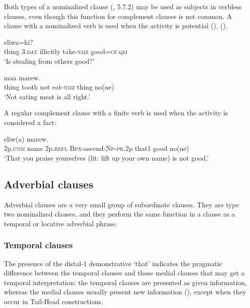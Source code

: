 Both types of a nominalized clause (, 5.7.2) may be used as subjects in verbless clauses, even though this function for complement clauses is not common. A clause with a nominalized verb is used when the activity is potential (), (). 

\ea%
\label{ex:x1636}
  eliwa=ki? \\
thing  3.\textsc{dat} illicitly take-\textsc{nmz} good=\textsc{cf}.\textsc{qm}\\
\glt`Is stealing from others good?'
\z


\ea%
\label{ex:x1637}
  maa  marew.\\
thing  tooth  not  eat-\textsc{nmz} thing  no(ne)\\
\glt`Not eating meat is all right.'
\z


A regular complement clause with a finite verb is used when the activity is considered a fact:

\ea%
\label{ex:x1639}
  eliw(a) marew.\\
2p.\textsc{unm} name 2p.\textsc{refl} \textsc{Bpx}-ascend-\textsc{Np}-\textsc{pr}.2p that1 good no(ne)\\
\glt`That you praise yourselves (lit: lift up your own name) is not good.'
\z


\subsection{Adverbial clauses}

Adverbial clauses are a very small group of subordinate clauses. They are type two nominalized clauses, and they perform the same function in a clause as a temporal or locative adverbial phrase. 

\subsubsection[Temporal clauses ]{Temporal clauses} 

The presence of the distal-1 demonstrative  `that' indicates the pragmatic difference between the temporal clauses and those medial clauses that may get a temporal interpretation: the temporal clauses are presented as given information, whereas the medial clauses usually present new information (), except when they occur in Tail-Head constructions.


